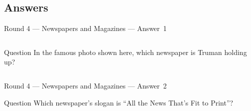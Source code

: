 \documentclass[11pt]{beamer}
\begin{document}
\subsection{Answers}
\begin{frame}[t]{Round 4 --- Newspapers and Magazines --- \mbox{Answer 1}}
    \vspace{-0.5em}
    \begin{columns}[T,totalwidth=\linewidth]
        \begin{column}{0.32\linewidth}
            \begin{block}{Question}
                In the famous photo shown here, which newspaper is Truman holding up?
            \end{block}
        \end{column}
        \begin{column}{0.65\linewidth}
            \begin{center}
                \texttt{[image: \{Images/DeweyTruman]}.jpg}
            \end{center}
        \end{column}
    \end{columns}
\end{frame}
\begin{frame}[t]{Round 4 --- Newspapers and Magazines --- \mbox{Answer 2}}
    \vspace{-0.5em}
    \begin{block}{Question}
        Which newspaper's slogan is ``All the News That's Fit to Print''?
    \end{block}
\end{frame}
\end{document}
